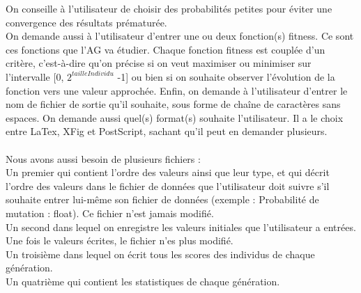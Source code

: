 \documentclass[a4paper,11pt]{article}
\begin{document}
		On conseille à l’utilisateur de choisir des probabilités petites pour éviter une convergence des résultats prématurée.\\
		On demande aussi à l’utilisateur d’entrer une ou deux fonction(s) fitness.
		Ce sont ces fonctions que l’AG va étudier.
		Chaque fonction fitness est couplée d’un critère, c’est-à-dire qu’on précise si on veut maximiser ou minimiser sur l’intervalle [0, $2^{tailleIndividu}$ -1] ou bien si on souhaite observer l’évolution de la fonction vers une valeur approchée.
		Enfin, on demande à l’utilisateur d’entrer le nom de fichier de sortie qu’il souhaite, sous forme de chaîne de caractères sans espaces.
		On demande aussi quel(s) format(s) souhaite l’utilisateur.
		Il a le choix entre LaTex, XFig et PostScript, sachant qu’il peut en demander plusieurs.\\
		\\
		Nous avons aussi besoin de plusieurs fichiers :\\

		Un premier qui contient l’ordre des valeurs ainsi que leur type, et qui décrit l'ordre des valeurs dans le fichier de données que l'utilisateur doit suivre s'il souhaite entrer lui-même son fichier de données (exemple : Probabilité de mutation : float). Ce fichier n'est jamais modifié.\\
		Un second dans lequel on enregistre les valeurs initiales que l'utilisateur a entrées. Une fois le valeurs écrites, le fichier n'es plus modifié.\\
		Un troisième dans lequel on écrit tous les scores des individus de chaque génération.\\
		Un quatrième qui contient les statistiques de chaque génération.\\

		
\end{document}
